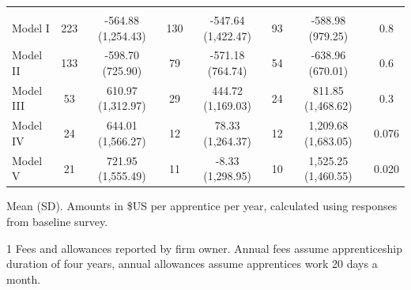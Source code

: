 \documentclass[
  11pt,
a4paper
]{article}
\begin{document}
\begin{table}[H]
{\begin{threeparttable}
\begin{tabular}[t]{lccccccc}
\addlinespace[0.3em]
\multicolumn{8}{l}{\textbf{Net Benefits}}\\
\hspace{1em}Model I & 223 & -564.88 (1,254.43) & 130 & -547.64 (1,422.47) & 93 & -588.98 (979.25) & 0.8\\
\hspace{1em}Model II & 133 & -598.70 (725.90) & 79 & -571.18 (764.74) & 54 & -638.96 (670.01) & 0.6\\
\hspace{1em}Model III & 53 & 610.97 (1,312.97) & 29 & 444.72 (1,169.03) & 24 & 811.85 (1,468.62) & 0.3\\
\hspace{1em}Model IV & 24 & 644.01 (1,566.27) & 12 & 78.33 (1,264.37) & 12 & 1,209.68 (1,683.05) & 0.076\\
\hspace{1em}Model V & 21 & 721.95 (1,555.49) & 11 & -8.33 (1,298.95) & 10 & 1,525.25 (1,460.55) & 0.020\\
\bottomrule
\end{tabular}
\begin{tablenotes}
\small
\item Mean (SD). Amounts in \$US per apprentice per year, calculated using responses from baseline survey.
\item[1] Fees and allowances reported by firm owner. Annual fees assume apprenticeship duration of four years, annual allowances assume apprentices work 20 days a month.
\end{tablenotes}
\end{threeparttable}}
\end{table}
\end{document}

